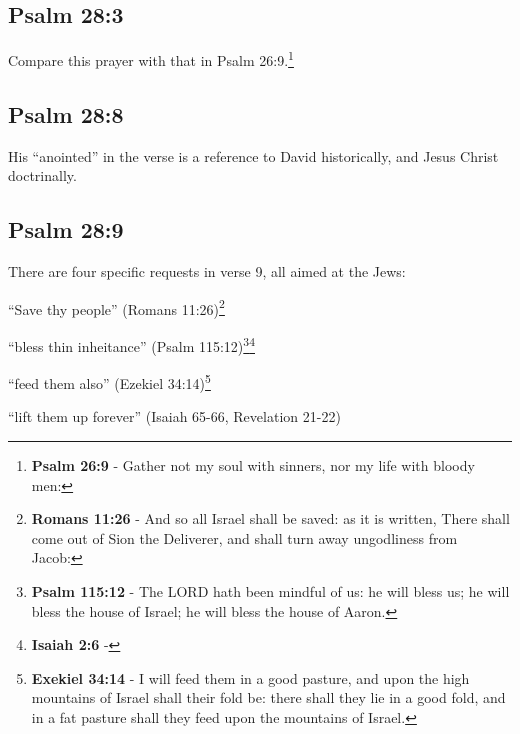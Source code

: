 \subsection{Psalm 28:3}
Compare this prayer with that in Psalm 26:9.\footnote{\textbf{Psalm 26:9} - Gather not my soul with sinners, nor my life with bloody men:} 

\subsection{Psalm 28:8}
His ``anointed'' in the verse is a reference to David historically, and Jesus Christ doctrinally.\cite{Ruckman1992Psalms}

\subsection{Psalm 28:9}
There are four specific requests in verse 9, all aimed at the Jews:\cite{Ruckman1992Psalms}
\begin{compactenum}
	\item ``Save thy people'' (Romans 11:26)\footnote{\textbf{Romans 11:26} - And so all Israel shall be saved: as it is written, There shall come out of Sion the Deliverer, and shall turn away ungodliness from Jacob:}
	\item ``bless thin inheitance'' (Psalm 115:12)\footnote{\textbf{Psalm 115:12} - The LORD hath been mindful of us: he will bless us; he will bless the house of Israel; he will bless the house of Aaron.}\footnote{\textbf{Isaiah 2:6} - }
	\item ``feed them also'' (Ezekiel 34:14)\footnote{\textbf{Exekiel 34:14} - I will feed them in a good pasture, and upon the high mountains of Israel shall their fold be: there shall they lie in a good fold, and in a fat pasture shall they feed upon the mountains of Israel.}
	\item ``lift them up forever'' (Isaiah 65-66, Revelation 21-22)
\end{compactenum}

